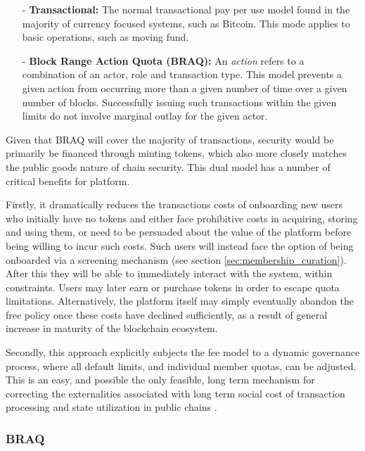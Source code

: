 \documentclass{article}
\begin{document}
\begin{itemize}

    \item[-] \textbf{Transactional:}  The normal transactional pay per use model found in the majority of currency focused systems, such as Bitcoin. This mode applies to basic operations, such as moving fund.

    \item[-] \textbf{Block Range Action Quota (BRAQ):} An \textit{action} refers to a combination of an actor, role and transaction type. This model prevents a given action from occurring more than a given number of time over a given number of blocks. Successfully issuing such transactions within the given limits do not involve marginal outlay for the given actor.

\end{itemize}

Given that BRAQ will cover the majority of transactions, security would be primarily be financed through minting tokens, which also more closely matches the public goods nature of chain security. This dual model has a number of critical benefits for platform.

Firstly, it dramatically reduces the transactions costs of onboarding new users who initially have no tokens and either face prohibitive costs in acquiring, storing and using them, or need to be persuaded about the value of the platform before being willing to incur such costs. Such users will instead face the option of being onboarded via a screening mechanism (see section \ref{sec:membership_curation}). After this they will be able to immediately interact with the system, within constraints. Users may later earn or purchase tokens in order to escape quota limitations. Alternatively, the platform itself may simply eventually abandon the free policy once these costs have declined sufficiently, as a result of general increase in maturity of the blockchain ecosystem.

Secondly, this approach explicitly subjects the fee model to a dynamic governance process, where all default limits, and individual member quotas, can be adjusted. This is an easy, and possible the only feasible, long term mechanism for correcting the externalities associated with long term social cost of transaction processing and state utilization in public chains \cite{blockchain_resource_pricing}.

\subsubsection{BRAQ} \label{sec:BRAQ}
\end{document}
